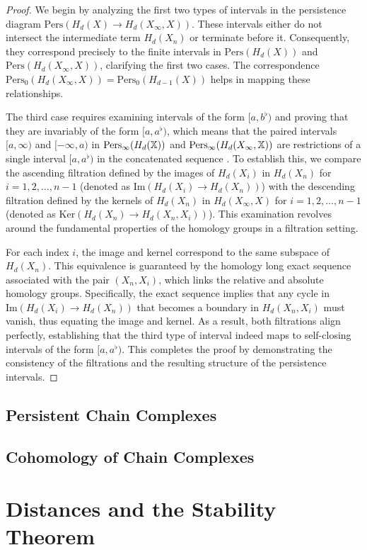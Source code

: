 \begin{proof}
We begin by analyzing the first two types of intervals in the persistence diagram \( \text{Pers}(H_d(X) \to H_d(X_\infty, X)) \). These intervals either do not intersect the intermediate term \( H_d(X_n) \) or terminate before it. Consequently, they correspond precisely to the finite intervals in \( \text{Pers}(H_d(X)) \) and \( \text{Pers}(H_d(X_\infty, X)) \), clarifying the first two cases. The correspondence \( \text{Pers}_0(H_d(X_\infty, X)) = \text{Pers}_0(H_{d-1}(X)) \) helps in mapping these relationships.

The third case requires examining intervals of the form \([a, b^\flat)\) and proving that they are invariably of the form \([a, a^\flat)\), which means that the paired intervals $[a,\infty)$ and $[-\infty,a)$ in $\text{Pers}_\infty(H_d({\mathbb X}))$ and $\text{Pers}_\infty(H_d(X_\infty, {\mathbb X}))$ are restrictions of a single interval $[a,a^\flat)$ in the concatenated sequence \cite[p.6]{de2011dualities}. To establish this, we compare the ascending filtration defined by the images of \( H_d(X_i) \) in \( H_d(X_n) \) for \( i = 1, 2, \ldots, n-1 \) (denoted as \( \text{Im}(H_d(X_i) \to H_d(X_n)) \)) with the descending filtration defined by the kernels of \( H_d(X_n) \) in \( H_d(X_\infty, X) \) for \( i = 1, 2, \ldots, n-1 \) (denoted as \( \text{Ker}(H_d(X_n) \to H_d(X_n, X_i)) \)). This examination revolves around the fundamental properties of the homology groups in a filtration setting.

For each index \( i \), the image and kernel correspond to the same subspace of \( H_d(X_n) \). This equivalence is guaranteed by the homology long exact sequence associated with the pair \( (X_n, X_i) \), which links the relative and absolute homology groups. Specifically, the exact sequence implies that any cycle in \( \text{Im}(H_d(X_i) \to H_d(X_n)) \) that becomes a boundary in \( H_d(X_n, X_i) \) must vanish, thus equating the image and kernel. As a result, both filtrations align perfectly, establishing that the third type of interval indeed maps to self-closing intervals of the form \([a, a^\flat)\). This completes the proof by demonstrating the consistency of the filtrations and the resulting structure of the persistence intervals.
\end{proof}


\subsection{Persistent Chain Complexes}

\subsection{Cohomology of Chain Complexes}

\section{Distances and the Stability Theorem}

